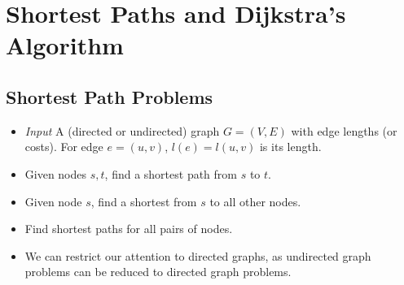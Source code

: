 \section{Shortest Paths and Dijkstra's Algorithm}

\subsection{Shortest Path Problems}
\begin{itemize}
    \item \textit{Input} A (directed or undirected) graph $G = (V, E)$ with edge lengths (or costs). For edge $e = (u, v)$, $l(e) = l(u, v)$ is its length.
    \item Given nodes $s, t$, find a shortest path from $s$ to $t$.
    \item Given node $s$, find a shortest from $s$ to all other nodes.
    \item Find shortest paths for all pairs of nodes.
    \item We can restrict our attention to directed graphs, as undirected graph problems can be reduced to directed graph problems.
\end{itemize}

